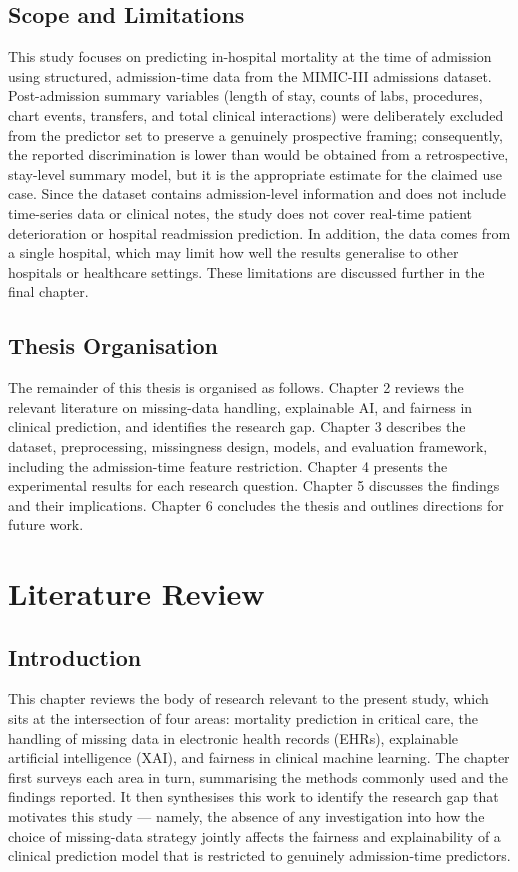 \documentclass[12pt,a4paper]{report}
\begin{document}
\section{Scope and Limitations}
This study focuses on predicting in-hospital mortality at the time of admission using structured, admission-time data from the MIMIC-III admissions dataset. Post-admission summary variables (length of stay, counts of labs, procedures, chart events, transfers, and total clinical interactions) were deliberately excluded from the predictor set to preserve a genuinely prospective framing; consequently, the reported discrimination is lower than would be obtained from a retrospective, stay-level summary model, but it is the appropriate estimate for the claimed use case. Since the dataset contains admission-level information and does not include time-series data or clinical notes, the study does not cover real-time patient deterioration or hospital readmission prediction. In addition, the data comes from a single hospital, which may limit how well the results generalise to other hospitals or healthcare settings. These limitations are discussed further in the final chapter.


\section{Thesis Organisation}
The remainder of this thesis is organised as follows. Chapter 2 reviews the relevant literature on missing-data handling, explainable AI, and fairness in clinical prediction, and identifies the research gap. Chapter 3 describes the dataset, preprocessing, missingness design, models, and evaluation framework, including the admission-time feature restriction. Chapter 4 presents the experimental results for each research question. Chapter 5 discusses the findings and their implications. Chapter 6 concludes the thesis and outlines directions for future work.


\chapter{Literature Review}

\section{Introduction}
This chapter reviews the body of research relevant to the present study, which sits at the intersection of four areas: mortality prediction in critical care, the handling of missing data in electronic health records (EHRs), explainable artificial intelligence (XAI), and fairness in clinical machine learning. The chapter first surveys each area in turn, summarising the methods commonly used and the findings reported. It then synthesises this work to identify the research gap that motivates this study --- namely, the absence of any investigation into how the choice of missing-data strategy jointly affects the fairness and explainability of a clinical prediction model that is restricted to genuinely admission-time predictors.
\end{document}
